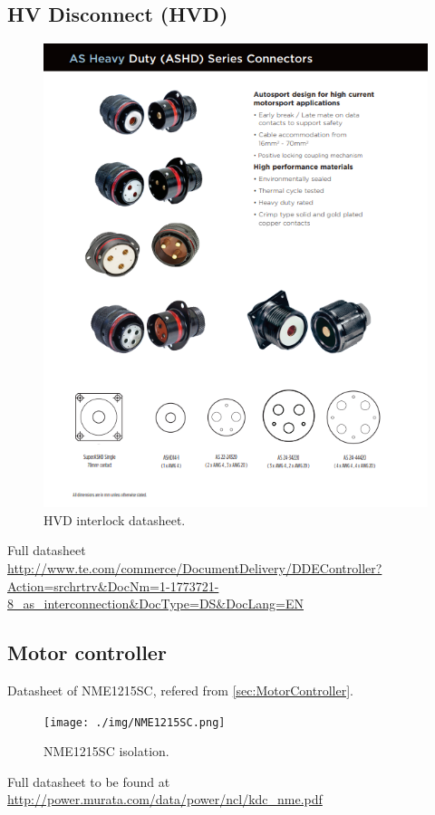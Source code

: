 \subsection{HV Disconnect (HVD)}

\begin{figure}[H]
	\centering
	\includegraphics[width=\textwidth]{./img/app-HVD.png}
	\caption{HVD interlock datasheet.}
	\label{app:HVD}
\end{figure}

Full datasheet \url{http://www.te.com/commerce/DocumentDelivery/DDEController?Action=srchrtrv&DocNm=1-1773721-8_as_interconnection&DocType=DS&DocLang=EN}

\subsection{Motor controller}

Datasheet of NME1215SC, refered from \ref{sec:MotorController}.
\begin{figure}[H]
	\centering
	\texttt{[image: ./img/NME1215SC.png]}
	\caption{NME1215SC isolation.}
	\label{app:NME1215SC}
\end{figure}
Full datasheet to be found at \url{http://power.murata.com/data/power/ncl/kdc_nme.pdf}

